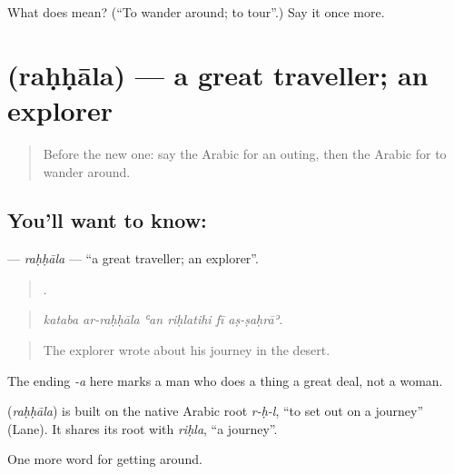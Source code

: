 \begin{tcolorbox}[breakable,colback=teal!4,colframe=teal!35!black,title={Before you move on}]
What does  mean? (\textquotedblleft{}To wander around; to tour\textquotedblright{}.) Say it once more.
\end{tcolorbox}
\section[\texorpdfstring{\ar{رحالة} (raḥḥāla)}{رحالة (raḥḥāla)}]{ (raḥḥāla) — a great traveller; an explorer}

\label{lesson:AR-C438-rahhala}



\begin{quote}
Before the new one: say the Arabic for an outing, then the Arabic for to wander around.
\end{quote}

\subsection*{You'll want to know: }
\textbf{} — \emph{raḥḥāla} — \textquotedblleft{}a great traveller; an explorer\textquotedblright{}.

\begin{quote}
     .
\end{quote}

\begin{quote}
\emph{kataba ar-raḥḥāla ʿan riḥlatihi fī aṣ-ṣaḥrāʾ.}
\end{quote}

\begin{quote}
The explorer wrote about his journey in the desert.
\end{quote}

The ending \emph{-a} here marks a man who does a thing a great deal, not a woman.

\begin{cousinweb}
\textbf{} (\emph{raḥḥāla}) is built on the native Arabic root \emph{r-ḥ-l}, \textquotedblleft{}to set out on a journey\textquotedblright{} (Lane). It shares its root with \emph{riḥla}, \textquotedblleft{}a journey\textquotedblright{}.
\end{cousinweb}

\begin{grammarlens}[title={What you've built}]
One more word for getting around.
\end{grammarlens}

